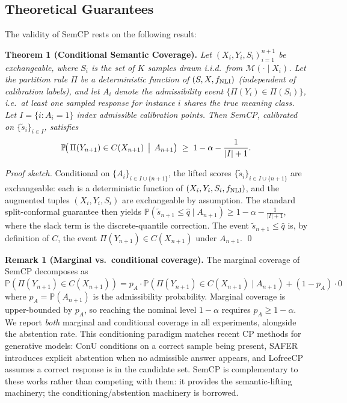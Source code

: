 \documentclass{article}
\begin{document}
\subsection{Theoretical Guarantees}

\label{sec:theoretical_guarantees}

The validity of SemCP rests on the following result:

\textbf{Theorem 1 (Conditional Semantic Coverage).} \textit{Let $(X_i, Y_i, S_i)_{i=1}^{n+1}$ be exchangeable, where $S_i$ is the set of $K$ samples drawn i.i.d.\ from $\mathcal{M}(\cdot \mid X_i)$. Let the partition rule $\Pi$ be a deterministic function of $(S, X, f_{\rm NLI})$ (independent of calibration labels), and let $A_i$ denote the admissibility event $\{\Pi(Y_i) \in \Pi(S_i)\}$, i.e.\ at least one sampled response for instance $i$ shares the true meaning class. Let $I = \{i : A_i = 1\}$ index admissible calibration points. Then SemCP, calibrated on $\{\tilde{s}_i\}_{i \in I}$, satisfies}
\begin{equation*}
   \mathbb{P}\!\bigl(\,\Pi(Y_{n+1}) \in C(X_{n+1})\,\bigm|\, A_{n+1}\bigr)
   \;\ge\; 1 - \alpha - \frac{1}{|I|+1}.
\end{equation*}

\textit{Proof sketch.} Conditional on $\{A_i\}_{i \in I \cup \{n+1\}}$, the lifted scores $\{\tilde{s}_i\}_{i \in I \cup \{n+1\}}$ are exchangeable: each is a deterministic function of $(X_i, Y_i, S_i, f_{\rm NLI})$, and the augmented tuples $(X_i, Y_i, S_i)$ are exchangeable by assumption. The standard split-conformal guarantee \cite{angelopoulos2024theoretical, vovk2005algorithmic} then yields $\mathbb{P}(\tilde{s}_{n+1} \le \hat{q} \mid A_{n+1}) \ge 1 - \alpha - \tfrac{1}{|I|+1}$, where the slack term is the discrete-quantile correction. The event $\tilde{s}_{n+1} \le \hat{q}$ is, by definition of $C$, the event $\Pi(Y_{n+1}) \in C(X_{n+1})$ under $A_{n+1}$. \qed

\textbf{Remark 1 (Marginal vs.\ conditional coverage).} The marginal coverage of SemCP decomposes as
$\mathbb{P}(\Pi(Y_{n+1}) \in C(X_{n+1})) = p_A \cdot \mathbb{P}(\Pi(Y_{n+1}) \in C(X_{n+1}) \mid A_{n+1}) + (1-p_A) \cdot 0$
where $p_A = \mathbb{P}(A_{n+1})$ is the admissibility probability. Marginal coverage is upper-bounded by $p_A$, so reaching the nominal level $1 - \alpha$ requires $p_A \ge 1 - \alpha$. We report \emph{both} marginal and conditional coverage in all experiments, alongside the abstention rate. This conditioning paradigm matches recent CP methods for generative models: ConU \cite{wang2024conu} conditions on a correct sample being present, SAFER \cite{kumar2025safer} introduces explicit abstention when no admissible answer appears, and LofreeCP \cite{su2024lofreecp} assumes a correct response is in the candidate set. SemCP is complementary to these works rather than competing with them: it provides the semantic-lifting machinery; the conditioning/abstention machinery is borrowed.
\end{document}
